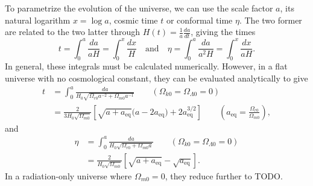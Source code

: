 \documentclass{aa}
\begin{document}
To parametrize the evolution of the universe,
we can use the scale factor $a$,
its natural logarithm $x = \log a$,
cosmic time $t$
or conformal time $\eta$.
The two former are related to the two latter through $H(t) = \frac1a \frac{da}{dt}$, giving the times
\begin{equation}
	t = \int_0^a \frac{da}{aH} = \int_0^x \frac{dx}{H}
	\quad \text{and} \quad
	\eta = \int_0^a \frac{da}{a^2 H} = \int_0^x \frac{dx}{aH}.
\label{eq_cosmic_conformal_time}
\end{equation}
In general, these integrals must be calculated numerically.
However, in a flat universe with no cosmological constant,
they can be evaluated analytically to give
\begin{equation}
\begin{aligned}
	t &= \int_0^a \frac{da}{H_0 \sqrt{\Omega_{r0}a^{-2} + \Omega_{m0}a^{-1}}} \qquad \left( \Omega_{k0} = \Omega_{\Lambda0} = 0 \right) \\
	  &=  \frac{2}{3 H_0 \sqrt{\Omega_{m0}}} \left[\sqrt{a + a_\text{eq}} \big(a - 2 a_\text{eq}\big) + 2 a_\text{eq}^{3/2} \right] \qquad \left(a_\text{eq} = \frac{\Omega_{r0}}{\Omega_{m0}}\right),
\end{aligned}
\label{eq_cosmic_time_anal}
\end{equation}
and
\begin{equation}
\begin{aligned}
	\eta &= \int_0^a \frac{da}{H_0 \sqrt{\Omega_{r0} + \Omega_{m0} a}} \qquad \left( \Omega_{k0} = \Omega_{\Lambda0} = 0 \right) \\
		 &= \frac{2}{H_0 \sqrt{\Omega_{m0}}} \left[ \sqrt{a + a_\text{eq}} - \sqrt{a_\text{eq}}\right].
\end{aligned}
\label{eq_conformal_time_anal}
\end{equation}
In a radiation-only universe where $\Omega_{m0}=0$,
they reduce further to TODO.
\end{document}
